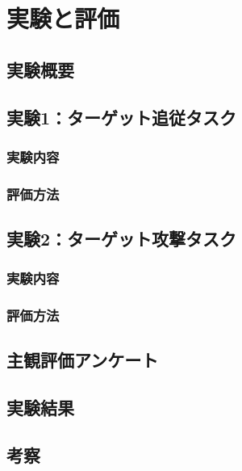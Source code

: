 \chapter{実験と評価}
\label{chap:experiment}

\section{実験概要}
\label{sec:experiment_overview}

\section{実験1：ターゲット追従タスク}
\label{sec:tracking_experiment}

\subsection{実験内容}
\subsection{評価方法}

\section{実験2：ターゲット攻撃タスク}
\label{sec:attack_experiment}

\subsection{実験内容}
\subsection{評価方法}

\section{主観評価アンケート}
\label{sec:questionnaire}

\section{実験結果}
\label{sec:results}

\section{考察}
\label{sec:discussion}